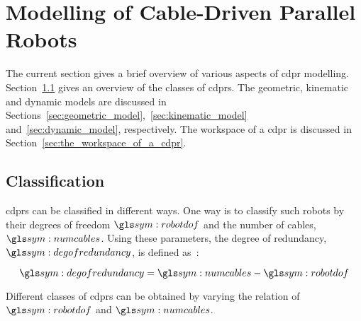 \section{Modelling of Cable-Driven Parallel Robots}%
\label{sec:modelling_of_cable_driven_parallel_robots}

	The current section gives a brief overview of various aspects of \gls{cdpr}
	modelling.  Section~\ref{sec:cdpr_classification} gives an overview of the
	classes of \glspl{cdpr}. The geometric, kinematic and dynamic models are
	discussed in Sections~\ref{sec:geometric_model},~\ref{sec:kinematic_model}
	and~\ref{sec:dynamic_model}, respectively. The workspace of a \gls{cdpr} is
	discussed in Section~\ref{sec:the_workspace_of_a_cdpr}.

    \subsection{ Classification}%
    \label{sec:cdpr_classification}

		\glspl{cdpr} can be classified in different ways.	One  way  is  to
		classify such robots by their degrees of  freedom  $\robotdof$	and  the
		number of cables, $\numcables$.  Using these parameters, the  degree  of
		redundancy, $\degofredundancy$, is defined
		as~\cite{bib:cdpr:cable_driven_parallel_robots_theory_and_application}:

        \begin{equation}
            \degofredundancy = \numcables - \robotdof
        \end{equation}

		Different classes  of  \glspl{cdpr}  can  be  obtained	by	varying  the
        relation of $\robotdof$ and $\numcables$.

